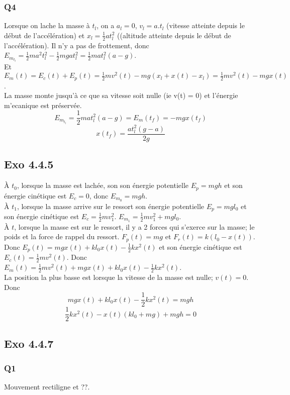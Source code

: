 \documentclass[]{book}
\theoremstyle{definition}
\begin{document}
\subsubsection{Q4}
Lorsque on lache la masse \`a $t_l$, on a $a_l=0$, $v_l = a.t_l$ (vitesse atteinte depuis le d\'ebut de l'acc\'el\'eration) et $x_l = \frac{1}{2}a{t_l^2}$ ((altitude atteinte depuis le d\'ebut de l'acc\'el\'eration). Il n'y a pas de frottement, donc $E_{m_{t_l}} = \frac{1}{2}ma^2t_l^2 - \frac{1}{2}mga{t_l^2} = \frac{1}{2}mat_l^2(a-g)$. \\
Et $E_m(t) = E_c(t) + E_p(t) = \frac{1}{2}mv^2(t) - mg(x_l + x(t)- x_l) = \frac{1}{2}mv^2(t) - mgx(t)$. \\
La masse monte jusqu'\`a ce que sa vitesse soit nulle (ie v(t) = 0) et l'\'energie m'ecanique est pr\'eserv\'ee.\\
$$E_{m_{t_l}} = \frac{1}{2}mat_l^2(a-g) = E_m(t_f) = -mgx(t_f) $$
$$x(t_f) = \frac{at_l^2(g-a)}{2g}$$


\subsection*{Exo 4.4.5}
\`A $t_0$, lorsque la masse est lach\'ee, son son \'energie potentielle $E_p = mgh$ et son \'energie cin\'etique est $E_c = 0$, donc $E_{m_0} = mgh$.\\
\`A $t_1$, lorsque la masse arrive sur le ressort son \'energie potentielle $E_p = mgl_0$ et son \'energie cin\'etique est $E_c = \frac{1}{2}mv_1^2$. $E_{m_1} = \frac{1}{2}mv_1^2+mgl_0$. \\
\`A $t$, lorsque la masse est sur le ressort, il y a 2 forces qui s'exerce sur la masse; le poids et la force de rappel du ressort. $F_p(t) = mg$ et $F_r(t) = k(l_0-x(t))$. Donc $E_p(t) = mgx(t) + kl_0x(t) -\frac{1}{2}kx^2(t)$ et son \'energie cin\'etique est $E_c(t) = \frac{1}{2}mv^2(t)$. Donc $E_m(t) = \frac{1}{2}mv^2(t) + mgx(t) + kl_0x(t) -\frac{1}{2}kx^2(t)$.\\

La position la plus basse est lorsque la vitesse de la masse est nulle; $v(t) = 0$. Donc
$$mgx(t) + kl_0x(t) -\frac{1}{2}kx^2(t) = mgh$$
$$\frac{1}{2}kx^2(t) -x(t)(kl_0+mg) + mgh = 0$$


\subsection*{Exo 4.4.7}
\subsubsection{Q1}
Mouvement rectiligne et ??.
\end{document}
